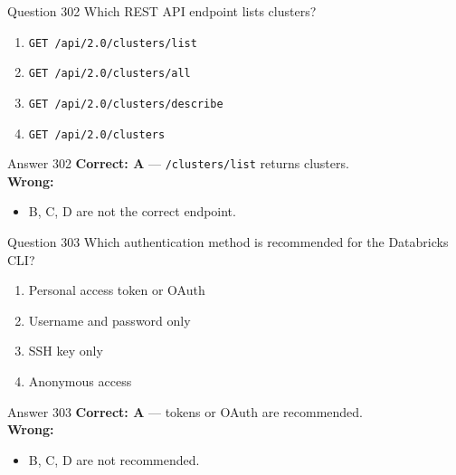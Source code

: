 \documentclass[aspectratio=169,11pt]{beamer}
\begin{document}
	\begin{frame}{Question 302}
		Which REST API endpoint lists clusters?
		\begin{enumerate}[label=\Alph*.]
			\item \texttt{GET /api/2.0/clusters/list}
			\item \texttt{GET /api/2.0/clusters/all}
			\item \texttt{GET /api/2.0/clusters/describe}
			\item \texttt{GET /api/2.0/clusters}
		\end{enumerate}
	\end{frame}
	\begin{frame}{Answer 302}
		\textbf{Correct: A} --- \texttt{/clusters/list} returns clusters.\\
		\vspace{0.5em}
		\textbf{Wrong:}
		\begin{itemize}
			\item B, C, D are not the correct endpoint.
		\end{itemize}
	\end{frame}
	
	\begin{frame}{Question 303}
		Which authentication method is recommended for the Databricks CLI?
		\begin{enumerate}[label=\Alph*.]
			\item Personal access token or OAuth
			\item Username and password only
			\item SSH key only
			\item Anonymous access
		\end{enumerate}
	\end{frame}
	\begin{frame}{Answer 303}
		\textbf{Correct: A} --- tokens or OAuth are recommended.\\
		\vspace{0.5em}
		\textbf{Wrong:}
		\begin{itemize}
			\item B, C, D are not recommended.
		\end{itemize}
	\end{frame}
	
\end{document}
